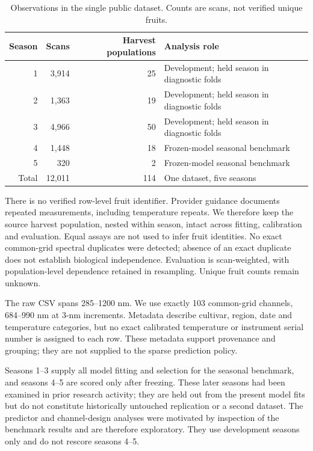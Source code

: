\documentclass[Review,sagev,times]{sagej}
\begin{document}
\begin{table}[bp]
\centering
\caption{Observations in the single public dataset. Counts are scans, not verified unique fruits.}\label{tab:data}
\begin{tabular}{rrrl}
\toprule
Season & Scans & Harvest populations & Analysis role \\
\midrule
1 & 3,914 & 25 & Development; held season in diagnostic folds \\
2 & 1,363 & 19 & Development; held season in diagnostic folds \\
3 & 4,966 & 50 & Development; held season in diagnostic folds \\
4 & 1,448 & 18 & Frozen-model seasonal benchmark \\
5 & 320 & 2 & Frozen-model seasonal benchmark \\
\midrule
Total & 12,011 & 114 & One dataset, five seasons \\
\bottomrule
\end{tabular}
\end{table}

There is no verified row-level fruit identifier. Provider guidance documents repeated measurements, including temperature repeats. We therefore keep the source harvest population, nested within season, intact across fitting, calibration and evaluation. Equal assays are not used to infer fruit identities. No exact common-grid spectral duplicates were detected; absence of an exact duplicate does not establish biological independence. Evaluation is scan-weighted, with population-level dependence retained in resampling. Unique fruit counts remain unknown.

The raw CSV spans 285--1200 nm. We use exactly 103 common-grid channels, 684--990 nm at 3-nm increments. Metadata describe cultivar, region, date and temperature categories, but no exact calibrated temperature or instrument serial number is assigned to each row. These metadata support provenance and grouping; they are not supplied to the sparse prediction policy.

Seasons 1--3 supply all model fitting and selection for the seasonal benchmark, and seasons 4--5 are scored only after freezing. These later seasons had been examined in prior research activity; they are held out from the present model fits but do not constitute historically untouched replication or a second dataset. The predictor and channel-design analyses were motivated by inspection of the benchmark results and are therefore exploratory. They use development seasons only and do not rescore seasons 4--5.
\end{document}
